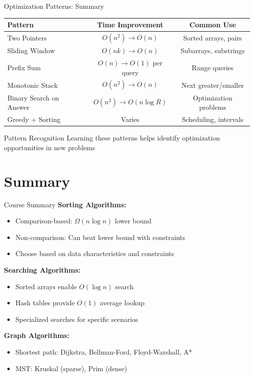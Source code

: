 \documentclass[aspectratio=169,xcolor=dvipsnames]{beamer}
\begin{document}
\begin{frame}{Optimization Patterns: Summary}
  \begin{table}
    \centering
    \small
    \begin{tabular}{lcc}
      \hline
      \textbf{Pattern} & \textbf{Time Improvement} & \textbf{Common Use} \\
      \hline
      Two Pointers & $O(n^2) \to O(n)$ & Sorted arrays, pairs \\
      Sliding Window & $O(nk) \to O(n)$ & Subarrays, substrings \\
      Prefix Sum & $O(n) \to O(1)$ per query & Range queries \\
      Monotonic Stack & $O(n^2) \to O(n)$ & Next greater/smaller \\
      Binary Search on Answer & $O(n^2) \to O(n \log R)$ & Optimization problems \\
      Greedy + Sorting & Varies & Scheduling, intervals \\
      \hline
    \end{tabular}
  \end{table}

  \vspace{0.3cm}
  \begin{block}{Pattern Recognition}
    Learning these patterns helps identify optimization opportunities in new problems
  \end{block}
\end{frame}

\section{Summary}

\begin{frame}{Course Summary}
  \textbf{Sorting Algorithms:}
  \begin{itemize}
    \item Comparison-based: $\Omega(n \log n)$ lower bound
    \item Non-comparison: Can beat lower bound with constraints
    \item Choose based on data characteristics and constraints
  \end{itemize}

  \vspace{0.2cm}
  \textbf{Searching Algorithms:}
  \begin{itemize}
    \item Sorted arrays enable $O(\log n)$ search
    \item Hash tables provide $O(1)$ average lookup
    \item Specialized searches for specific scenarios
  \end{itemize}

  \vspace{0.2cm}
  \textbf{Graph Algorithms:}
  \begin{itemize}
    \item Shortest path: Dijkstra, Bellman-Ford, Floyd-Warshall, A*
    \item MST: Kruskal (sparse), Prim (dense)
  \end{itemize}
\end{frame}
\end{document}
